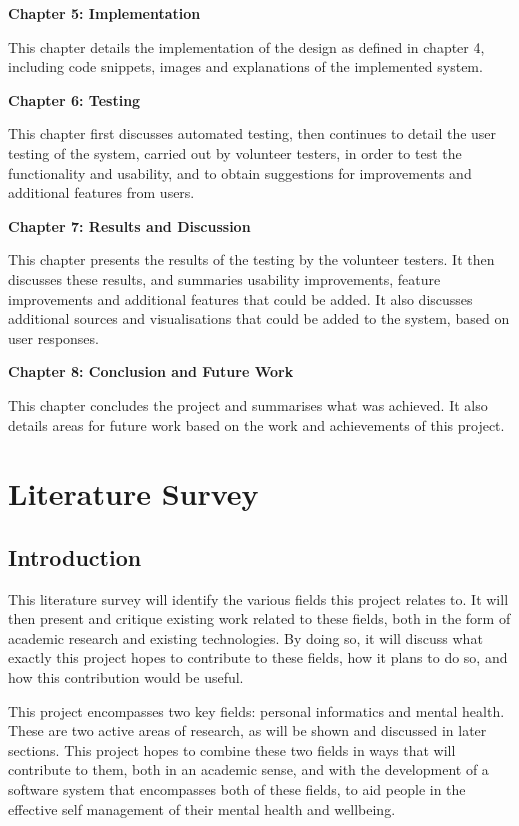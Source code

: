 \documentclass[11pt,openright,a4paper]{report}
\begin{document}
\textbf{Chapter 5: Implementation}

This chapter details the implementation of the design as defined in chapter 4, including code snippets, images and explanations of the implemented system.

\textbf{Chapter 6: Testing}

This chapter first discusses automated testing, then continues to detail the user testing of the system, carried out by volunteer testers, in order to test the functionality and usability, and to obtain suggestions for improvements and additional features from users.

\textbf{Chapter 7: Results and Discussion}

This chapter presents the results of the testing by the volunteer testers. It then discusses these results, and summaries usability improvements, feature improvements and additional features that could be added. It also discusses additional sources and visualisations that could be added to the system, based on user responses.

\textbf{Chapter 8: Conclusion and Future Work}

This chapter concludes the project and summarises what was achieved. It also details areas for future work based on the work and achievements of this project.

\chapter{Literature Survey} \label{litsurvey}
\section{Introduction} \label{introduction}
This literature survey will identify the various fields this project relates to. It will then present and critique existing work related to these fields, both in the form of academic research and existing technologies. By doing so, it will discuss what exactly this project hopes to contribute to these fields, how it plans to do so, and how this contribution would be useful.

This project encompasses two key fields: personal informatics and mental health. These are two active areas of research, as will be shown and discussed in later sections. This project hopes to combine these two fields in ways that will contribute to them, both in an academic sense, and with the development of a software system that encompasses both of these fields, to aid people in the effective self management of their mental health and wellbeing.
\end{document}
